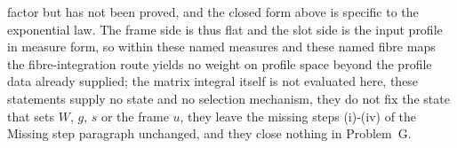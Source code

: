 factor but has not been proved, and the closed form above is specific to the exponential law. The frame side is thus flat and the slot side is the input profile in measure form, so within these named measures and these named fibre maps the fibre-integration route yields no weight on profile space beyond the profile data already supplied; the matrix integral itself is not evaluated here, these statements supply no state and no selection mechanism, they do not fix the state that sets \(W\), \(g\), \(s\) or the frame \(u\), they leave the missing steps (i)-(iv) of the Missing step paragraph unchanged, and they close nothing in Problem~G.
